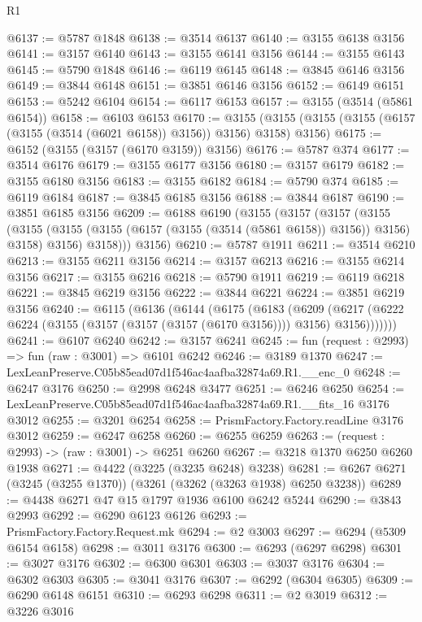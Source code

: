 \begin{lexlean}{R1}
\begin{coremodule}
@6137 := @5787 @1848
@6138 := @3514 @6137
@6140 := @3155 @6138 @3156
@6141 := @3157 @6140
@6143 := @3155 @6141 @3156
@6144 := @3155 @6143
@6145 := @5790 @1848
@6146 := @6119 @6145
@6148 := @3845 @6146 @3156
@6149 := @3844 @6148
@6151 := @3851 @6146 @3156
@6152 := @6149 @6151
@6153 := @5242 @6104
@6154 := @6117 @6153
@6157 := @3155 (@3514 (@5861 @6154))
@6158 := @6103 @6153
@6170 := @3155 (@3155 (@3155 (@3155 (@6157 (@3155 (@3514 (@6021 @6158)) @3156)) @3156) @3158) @3156)
@6175 := @6152 (@3155 (@3157 (@6170 @3159)) @3156)
@6176 := @5787 @374
@6177 := @3514 @6176
@6179 := @3155 @6177 @3156
@6180 := @3157 @6179
@6182 := @3155 @6180 @3156
@6183 := @3155 @6182
@6184 := @5790 @374
@6185 := @6119 @6184
@6187 := @3845 @6185 @3156
@6188 := @3844 @6187
@6190 := @3851 @6185 @3156
@6209 := @6188
    @6190
    (@3155
      (@3157
        (@3157
          (@3155
            (@3155 (@3155 (@3155 (@6157 (@3155 (@3514 (@5861 @6158)) @3156)) @3156) @3158) @3156)
            @3158)))
      @3156)
@6210 := @5787 @1911
@6211 := @3514 @6210
@6213 := @3155 @6211 @3156
@6214 := @3157 @6213
@6216 := @3155 @6214 @3156
@6217 := @3155 @6216
@6218 := @5790 @1911
@6219 := @6119 @6218
@6221 := @3845 @6219 @3156
@6222 := @3844 @6221
@6224 := @3851 @6219 @3156
@6240 := @6115
    (@6136
      (@6144
        (@6175
          (@6183
            (@6209
              (@6217 (@6222 @6224 (@3155 (@3157 (@3157 (@3157 (@6170 @3156)))) @3156) @3156)))))))
@6241 := @6107 @6240
@6242 := @3157 @6241
@6245 := fun (request : @2993) => fun (raw : @3001) => @6101 @6242
@6246 := @3189 @1370
@6247 := LexLeanPreserve.C05b85ead07d1f546ac4aafba32874a69.R1.__enc_0
@6248 := @6247 @3176
@6250 := @2998 @6248 @3477
@6251 := @6246 @6250
@6254 := LexLeanPreserve.C05b85ead07d1f546ac4aafba32874a69.R1.__fits_16 @3176 @3012
@6255 := @3201 @6254
@6258 := PrismFactory.Factory.readLine @3176 @3012
@6259 := @6247 @6258
@6260 := @6255 @6259
@6263 := (request : @2993) -> (raw : @3001) -> @6251 @6260
@6267 := @3218 @1370 @6250 @6260 @1938
@6271 := @4422 (@3225 (@3235 @6248) @3238)
@6281 := @6267 @6271 (@3245 (@3255 @1370)) (@3261 (@3262 (@3263 @1938) @6250 @3238))
@6289 := @4438 @6271 @47 @15 @1797 @1936 @6100 @6242 @5244
@6290 := @3843 @2993
@6292 := @6290 @6123 @6126
@6293 := PrismFactory.Factory.Request.mk
@6294 := @2 @3003
@6297 := @6294 (@5309 @6154 @6158)
@6298 := @3011 @3176
@6300 := @6293 (@6297 @6298)
@6301 := @3027 @3176
@6302 := @6300 @6301
@6303 := @3037 @3176
@6304 := @6302 @6303
@6305 := @3041 @3176
@6307 := @6292 (@6304 @6305)
@6309 := @6290 @6148 @6151
@6310 := @6293 @6298
@6311 := @2 @3019
@6312 := @3226 @3016

\end{coremodule}
\end{lexlean}
